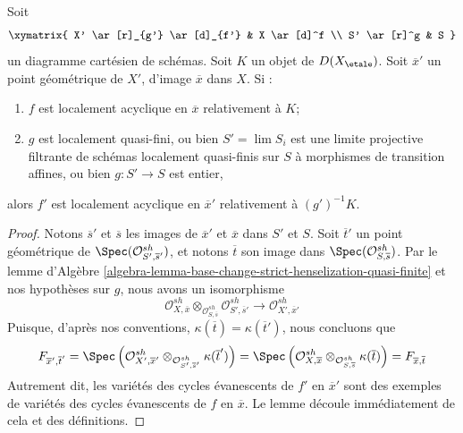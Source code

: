 \begin{lemma}
\label{lemma-locally-acyclic-quasi-finite-base-change}
Soit
$$
\xymatrix{
X' \ar[r]_{g'} \ar[d]_{f'} & X \ar[d]^f \\
S' \ar[r]^g & S
}
$$
un diagramme cartésien de schémas. Soit $K$ un objet de $D(X_\etale)$.
Soit $\overline{x}'$ un point géométrique de $X'$, d'image $\overline{x}$
dans $X$. Si :
\begin{enumerate}
\item $f$ est localement acyclique en $\overline{x}$ relativement à $K$;
\item $g$ est localement quasi-fini, ou bien $S' = \lim S_i$
est une limite projective filtrante de schémas localement quasi-finis sur $S$
à morphismes de transition affines, ou bien $g : S' \to S$ est entier,
\end{enumerate}
alors $f'$ est localement acyclique en $\overline{x}'$ relativement à $(g')^{-1}K$.
\end{lemma}

\begin{proof}
Notons $\overline{s}'$ et $\overline{s}$ les images de
$\overline{x}'$ et $\overline{x}$ dans $S'$ et $S$.
Soit $\overline{t}'$ un point géométrique de
$\Spec(\mathcal{O}^{sh}_{S', \overline{s}'})$, et notons
$\overline{t}$ son image dans $\Spec(\mathcal{O}^{sh}_{S, \overline{s}})$.
Par le lemme d'Algèbre
\ref{algebra-lemma-base-change-strict-henselization-quasi-finite}
et nos hypothèses sur $g$, nous avons un isomorphisme
$$
\mathcal{O}^{sh}_{X, \overline{x}}
\otimes_{\mathcal{O}^{sh}_{S, \overline{s}}}
\mathcal{O}^{sh}_{S', \overline{s}'}
\longrightarrow
\mathcal{O}^{sh}_{X', \overline{x}'}
$$
Puisque, d'après nos conventions,
$\kappa(\overline{t}) = \kappa(\overline{t}')$,
nous concluons que
$$
F_{\overline{x}', \overline{t}'} =
\Spec\left(
\mathcal{O}^{sh}_{X', \overline{x}'}
\otimes_{\mathcal{O}^{sh}_{S', \overline{s}'}}
\kappa(\overline{t}')\right) =
\Spec\left(
\mathcal{O}^{sh}_{X, \overline{x}}
\otimes_{\mathcal{O}^{sh}_{S, \overline{s}}}
\kappa(\overline{t})\right) =
F_{\overline{x}, \overline{t}}
$$
Autrement dit, les variétés des cycles évanescents
de $f'$ en $\overline{x}'$ sont des exemples de variétés des cycles
évanescents de $f$ en $\overline{x}$. Le lemme découle
immédiatement de cela et des définitions.
\end{proof}










